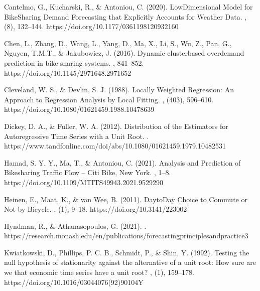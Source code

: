 \documentclass[letterpaper,10pt,english]{jupyterBook}
\begin{document}
\sphinxAtStartPar
Cantelmo, G., Kucharski, R., \& Antoniou, C. (2020). Low\sphinxhyphen{}Dimensional Model for Bike\sphinxhyphen{}Sharing Demand Forecasting that Explicitly Accounts for Weather Data. , (8), 132–144. https://doi.org/10.1177/0361198120932160

\sphinxAtStartPar
Chen, L., Zhang, D., Wang, L., Yang, D., Ma, X., Li, S., Wu, Z., Pan, G., Nguyen, T.\sphinxhyphen{}M.\sphinxhyphen{}T., \& Jakubowicz, J. (2016). Dynamic cluster\sphinxhyphen{}based over\sphinxhyphen{}demand prediction in bike sharing systems. , 841–852. https://doi.org/10.1145/2971648.2971652

\sphinxAtStartPar
Cleveland, W. S., \& Devlin, S. J. (1988). Locally Weighted Regression: An Approach to Regression Analysis by Local Fitting. , (403), 596–610. https://doi.org/10.1080/01621459.1988.10478639

\sphinxAtStartPar
Dickey, D. A., \& Fuller, W. A. (2012). Distribution of the Estimators for Autoregressive Time Series with a Unit Root. . https://www.tandfonline.com/doi/abs/10.1080/01621459.1979.10482531

\sphinxAtStartPar
Hamad, S. Y. Y., Ma, T., \& Antoniou, C. (2021). Analysis and Prediction of Bikesharing Traffic Flow – Citi Bike, New York. , 1–8. https://doi.org/10.1109/MT\sphinxhyphen{}ITS49943.2021.9529290

\sphinxAtStartPar
Heinen, E., Maat, K., \& van Wee, B. (2011). Day\sphinxhyphen{}to\sphinxhyphen{}Day Choice to Commute or Not by Bicycle. , (1), 9–18. https://doi.org/10.3141/2230\sphinxhyphen{}02

\sphinxAtStartPar
Hyndman, R., \& Athanasopoulos, G. (2021). . https://research.monash.edu/en/publications/forecasting\sphinxhyphen{}principles\sphinxhyphen{}and\sphinxhyphen{}practice\sphinxhyphen{}3

\sphinxAtStartPar
Kwiatkowski, D., Phillips, P. C. B., Schmidt, P., \& Shin, Y. (1992). Testing the null hypothesis of stationarity against the alternative of a unit root: How sure are we that economic time series have a unit root? , (1), 159–178. https://doi.org/10.1016/0304\sphinxhyphen{}4076(92)90104\sphinxhyphen{}Y
\end{document}
